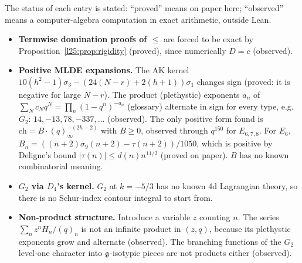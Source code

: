 \begin{warning}[title={Dead ends for the star bound (do not retry)}]
The status of each entry is stated: ``proved'' means on paper here; ``observed'' means a computer-algebra computation
in exact arithmetic, outside Lean.
\begin{itemize}
\item \textbf{Termwise domination proofs of $\le$} are forced to be exact by Proposition~\ref{l25:prop:rigidity} (proved),
  since numerically $D=c$ (observed).
\item \textbf{Positive MLDE expansions.} The AK kernel $10(h^2-1)\sigma_3-(24(N-r)+2(h+1))\sigma_1$ changes sign (proved: it
  is negative for large $N-r$). The product (plethystic) exponents $a_n$ of $\sum_Nc_Nq^N=\prod_n(1-q^n)^{-a_n}$
  (glossary) alternate in sign for every type, e.g.\ $G_2$: $14,-13,78,-337,\dots$ (observed). The only positive form
  found is $\mathrm{ch}=B\cdot(q)_\infty^{-(2h-2)}$ with $B\ge0$, observed through $q^{150}$ for $E_{6,7,8}$. For $E_6$,
  $B_n=((n+2)\sigma_9(n+2)-\tau(n+2))/1050$, which is positive by Deligne's bound $|\tau(n)|\le d(n)n^{11/2}$ (proved on
  paper). $B$ has no known combinatorial meaning.
\item \textbf{$G_2$ via $D_4$'s kernel.} $G_2$ at $k=-5/3$ has no known 4d Lagrangian theory, so there is no Schur-index
  contour integral to start from.
\item \textbf{Non-product structure.} Introduce a variable $z$ counting $n$. The series $\sum_nz^nH_n/(q)_n$ is not an
  infinite product in $(z,q)$, because its plethystic exponents grow and alternate (observed). The branching functions
  of the $G_2$ level-one character into $\mathfrak g$-isotypic pieces are not products either (observed).
\end{itemize}
\end{warning}

